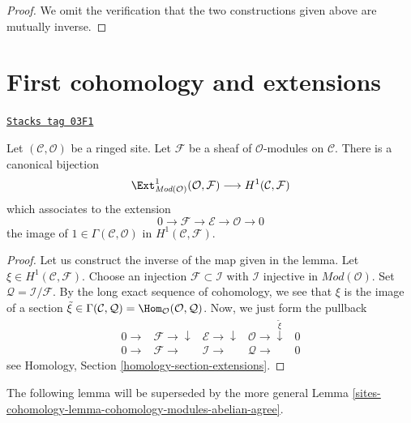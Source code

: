 \begin{proof}
\medskip\noindent
We omit the verification that the two constructions given
above are mutually inverse.
\end{proof}

\section{First cohomology and extensions}
\label{sites-cohomology-section-h1-extensions}
\begin{lemma}[H1 extensions]
\label{sites-cohomology-lemma-h1-extensions}
\href{https://stacks.math.columbia.edu/tag/03F1}{\texttt{Stacks tag 03F1}}

Let $(\mathcal{C}, \mathcal{O})$ be a ringed site.
Let $\mathcal{F}$ be a sheaf of $\mathcal{O}$-modules on $\mathcal{C}$.
There is a canonical bijection
$$
\Ext^1_{\textit{Mod}(\mathcal{O})}(\mathcal{O}, \mathcal{F})
\longrightarrow
H^1(\mathcal{C}, \mathcal{F})
$$
which associates to the extension
$$
0 \to \mathcal{F} \to \mathcal{E} \to \mathcal{O} \to 0
$$
the image of $1 \in \Gamma(\mathcal{C}, \mathcal{O})$ in
$H^1(\mathcal{C}, \mathcal{F})$.
\end{lemma}

\begin{proof}
Let us construct the inverse of the map given in the lemma.
Let $\xi \in H^1(\mathcal{C}, \mathcal{F})$.
Choose an injection $\mathcal{F} \subset \mathcal{I}$ with
$\mathcal{I}$ injective in $\textit{Mod}(\mathcal{O})$.
Set $\mathcal{Q} = \mathcal{I}/\mathcal{F}$.
By the long exact sequence of cohomology, we see that
$\xi$ is the image of a section
$\tilde \xi \in \Gamma(\mathcal{C}, \mathcal{Q}) =
\Hom_\mathcal{O}(\mathcal{O}, \mathcal{Q})$.
Now, we just form the pullback
$$
\begin{array}{ccccc}0 \longrightarrow & \mathcal{F} \longrightarrow\downarrow & \mathcal{E} \longrightarrow\downarrow & \mathcal{O} \longrightarrow\overset{\tilde \xi}{\downarrow} & 0 \\ 0 \longrightarrow & \mathcal{F} \longrightarrow & \mathcal{I} \longrightarrow & \mathcal{Q} \longrightarrow & 0\end{array}
$$
see Homology, Section \ref{homology-section-extensions}.
\end{proof}

The following lemma will be superseded by the more general
Lemma \ref{sites-cohomology-lemma-cohomology-modules-abelian-agree}.

